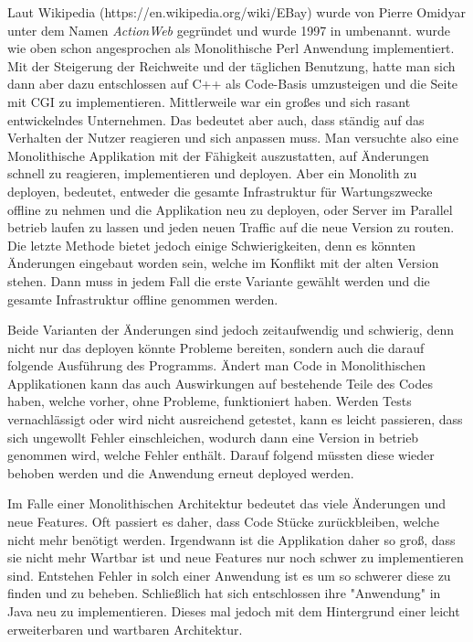 Laut Wikipedia (https://en.wikipedia.org/wiki/EBay) wurde  von Pierre Omidyar unter dem Namen \textit{ActionWeb} gegründet und wurde 1997 in \ebay umbenannt. \ebay wurde wie oben schon angesprochen als Monolithische Perl Anwendung implementiert. Mit der Steigerung der Reichweite und der täglichen Benutzung, hatte man sich dann aber dazu entschlossen auf C++ als Code-Basis umzusteigen und die Seite mit CGI zu implementieren. Mittlerweile war \ebay ein großes und sich rasant entwickelndes Unternehmen. Das bedeutet aber auch, dass \ebay ständig auf das Verhalten der Nutzer reagieren und sich anpassen muss. Man versuchte also eine Monolithische Applikation mit der Fähigkeit auszustatten, auf Änderungen schnell zu reagieren, implementieren und deployen. Aber ein Monolith zu deployen, bedeutet, entweder die gesamte Infrastruktur für Wartungszwecke offline zu nehmen und die Applikation neu zu deployen, oder Server im Parallel betrieb laufen zu lassen und jeden neuen Traffic auf die neue Version zu routen. Die letzte Methode bietet jedoch einige Schwierigkeiten, denn es könnten Änderungen eingebaut worden sein, welche im Konflikt mit der alten Version stehen. Dann muss in jedem Fall die erste Variante gewählt werden und die gesamte Infrastruktur offline genommen werden.

Beide Varianten der Änderungen sind jedoch zeitaufwendig und  schwierig, denn nicht nur das deployen könnte Probleme bereiten, sondern auch die darauf folgende Ausführung des Programms. Ändert man Code in Monolithischen Applikationen kann das auch Auswirkungen auf bestehende Teile des Codes haben, welche vorher, ohne Probleme, funktioniert haben. Werden Tests vernachlässigt oder wird nicht ausreichend getestet, kann es leicht passieren, dass sich ungewollt Fehler einschleichen, wodurch dann eine Version in betrieb genommen wird, welche Fehler enthält. Darauf folgend müssten diese wieder behoben werden und die Anwendung erneut deployed werden.

Im Falle einer Monolithischen Architektur bedeutet das viele Änderungen und neue Features. Oft passiert es daher, dass Code Stücke zurückbleiben, welche nicht mehr benötigt werden. Irgendwann ist die Applikation daher so groß, dass sie nicht mehr Wartbar ist und neue Features nur noch schwer zu implementieren sind. Entstehen Fehler in solch einer Anwendung ist es um so schwerer diese zu finden und zu beheben. Schließlich hat sich \ebay entschlossen ihre "Anwendung" in Java neu zu implementieren. Dieses mal jedoch mit dem Hintergrund einer leicht erweiterbaren und wartbaren Architektur.

